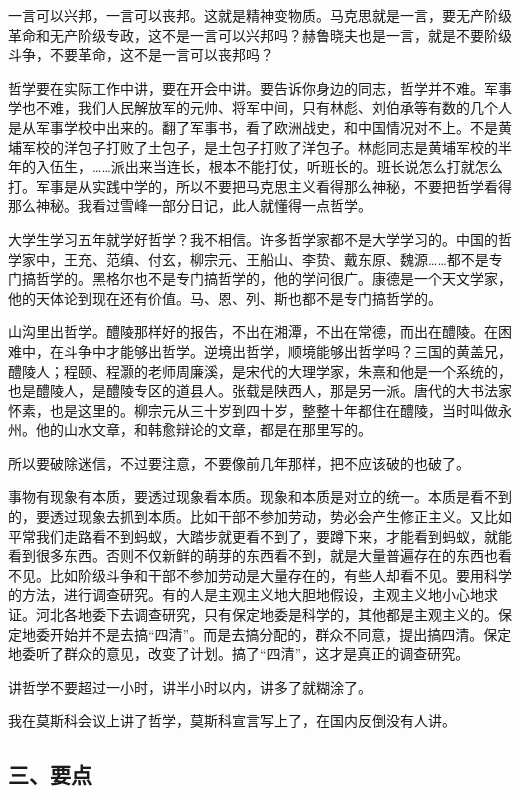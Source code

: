 一言可以兴邦，一言可以丧邦。这就是精神变物质。马克思就是一言，要无产阶级革命和无产阶级专政，这不是一言可以兴邦吗？赫鲁晓夫也是一言，就是不要阶级斗争，不要革命，这不是一言可以丧邦吗？

哲学要在实际工作中讲，要在开会中讲。要告诉你身边的同志，哲学并不难。军事学也不难，我们人民解放军的元帅、将军中间，只有林彪、刘伯承等有数的几个人是从军事学校中出来的。翻了军事书，看了欧洲战史，和中国情况对不上。不是黄埔军校的洋包子打败了土包子，是土包子打败了洋包子。林彪同志是黄埔军校的半年的入伍生，……派出来当连长，根本不能打仗，听班长的。班长说怎么打就怎么打。军事是从实践中学的，所以不要把马克思主义看得那么神秘，不要把哲学看得那么神秘。我看过雪峰一部分日记，此人就懂得一点哲学。

大学生学习五年就学好哲学？我不相信。许多哲学家都不是大学学习的。中国的哲学家中，王充、范缜、付玄，柳宗元、王船山、李贽、戴东原、魏源……都不是专门搞哲学的。黑格尔也不是专门搞哲学的，他的学问很广。康德是一个天文学家，他的天体论到现在还有价值。马、恩、列、斯也都不是专门搞哲学的。

山沟里出哲学。醴陵那样好的报告，不出在湘潭，不出在常德，而出在醴陵。在困难中，在斗争中才能够出哲学。逆境出哲学，顺境能够出哲学吗？三国的黄盖兄，醴陵人；程颐、程灏的老师周廉溪，是宋代的大理学家，朱熹和他是一个系统的，也是醴陵人，是醴陵专区的道县人。张载是陕西人，那是另一派。唐代的大书法家怀素，也是这里的。柳宗元从三十岁到四十岁，整整十年都住在醴陵，当时叫做永州。他的山水文章，和韩愈辩论的文章，都是在那里写的。

所以要破除迷信，不过要注意，不要像前几年那样，把不应该破的也破了。

事物有现象有本质，要透过现象看本质。现象和本质是对立的统一。本质是看不到的，要透过现象去抓到本质。比如干部不参加劳动，势必会产生修正主义。又比如平常我们走路看不到蚂蚁，大踏步就更看不到了，要蹲下来，才能看到蚂蚁，就能看到很多东西。否则不仅新鲜的萌芽的东西看不到，就是大量普遍存在的东西也看不见。比如阶级斗争和干部不参加劳动是大量存在的，有些人却看不见。要用科学的方法，进行调查研究。有的人是主观主义地大胆地假设，主观主义地小心地求证。河北各地委下去调查研究，只有保定地委是科学的，其他都是主观主义的。保定地委开始并不是去搞“四清”。而是去搞分配的，群众不同意，提出搞四清。保定地委听了群众的意见，改变了计划。搞了“四清”，这才是真正的调查研究。

讲哲学不要超过一小时，讲半小时以内，讲多了就糊涂了。

我在莫斯科会议上讲了哲学，莫斯科宣言写上了，在国内反倒没有人讲。

\subsection{三、要点}

